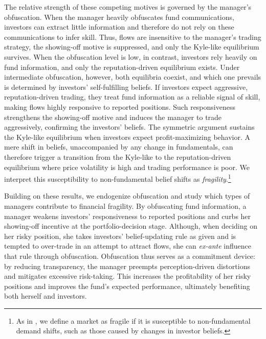 The relative strength of these competing motives is governed by the manager's obfuscation. When the manager heavily obfuscates fund communications, investors can extract little information and therefore do not rely on these communications to infer skill. Thus, flows are insensitive to the manager's trading strategy, the showing-off motive is suppressed, and only the Kyle-like equilibrium survives. When the obfuscation level is low, in contrast, investors rely heavily on fund information, and only the reputation-driven equilibrium exists. Under intermediate obfuscation, however, both equilibria coexist, and which one prevails is determined by investors' self-fulfilling beliefs. If investors expect aggressive, reputation-driven trading, they treat fund information as a reliable signal of skill, making flows highly responsive to reported positions. Such responsiveness strengthens the showing-off motive and induces the manager to trade aggressively, confirming the investors' beliefs. The symmetric argument sustains the Kyle-like equilibrium when investors expect profit-maximizing behavior. A mere shift in beliefs, unaccompanied by any change in fundamentals, can therefore trigger a transition from the Kyle-like to the reputation-driven equilibrium where price volatility is high and trading performance is poor. We interpret this susceptibility to non-fundamental belief shifts as \textit{fragility}.\footnote{As in \citet{greenwood2011stock}, we define a market as fragile if it is susceptible to non-fundamental demand shifts, such as those caused by changes in investor beliefs.} 

Building on these results, we endogenize obfuscation and study which types of managers contribute to financial fragility. By obfuscating fund information, a manager weakens investors' responsiveness to reported positions and curbs her showing-off incentive at the portfolio-decision stage. Although, when deciding on her risky position, she takes investors' belief-updating rule as given and is tempted to over-trade in an attempt to attract flows, she can \textit{ex-ante} influence that rule through obfuscation. Obfuscation thus serves as a commitment device: by reducing transparency, the manager preempts perception-driven distortions and mitigates excessive risk-taking. This increases the profitability of her risky positions and improves the fund’s expected performance, ultimately benefiting both herself and investors.

